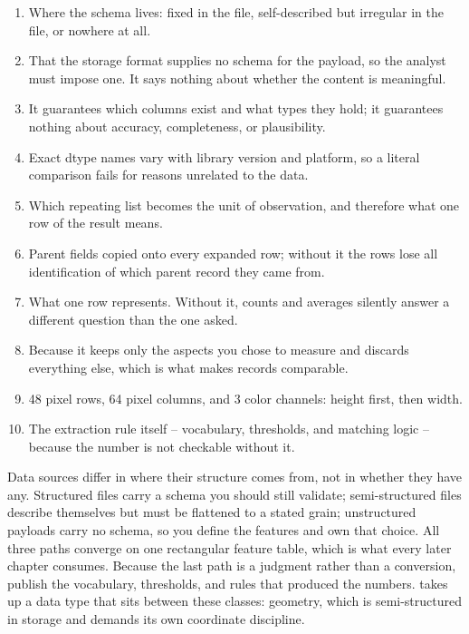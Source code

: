 \begin{enumerate}
    \item Where the schema lives: fixed in the file, self-described but
          irregular in the file, or nowhere at all.
    \item That the storage format supplies no schema for the payload, so the
          analyst must impose one. It says nothing about whether the content is
          meaningful.
    \item It guarantees which columns exist and what types they hold; it
          guarantees nothing about accuracy, completeness, or plausibility.
    \item Exact dtype names vary with library version and platform, so a literal
          comparison fails for reasons unrelated to the data.
    \item Which repeating list becomes the unit of observation, and therefore
          what one row of the result means.
    \item Parent fields copied onto every expanded row; without it the rows lose
          all identification of which parent record they came from.
    \item What one row represents. Without it, counts and averages silently
          answer a different question than the one asked.
    \item Because it keeps only the aspects you chose to measure and discards
          everything else, which is what makes records comparable.
    \item 48 pixel rows, 64 pixel columns, and 3 color channels: height first,
          then width.
    \item The extraction rule itself -- vocabulary, thresholds, and matching
          logic -- because the number is not checkable without it.
\end{enumerate}

\begin{tcolorbox}[title=Part V summary,colframe=orange,colback=white,arc=2mm]
Data sources differ in where their structure comes from, not in whether they
have any. Structured files carry a schema you should still validate;
semi-structured files describe themselves but must be flattened to a stated
grain; unstructured payloads carry no schema, so you define the features and own
that choice. All three paths converge on one rectangular feature table, which is
what every later chapter consumes. Because the last path is a judgment rather
than a conversion, publish the vocabulary, thresholds, and rules that produced
the numbers.  takes up a data type that sits between
these classes: geometry, which is semi-structured in storage and demands its own
coordinate discipline.
\end{tcolorbox}
